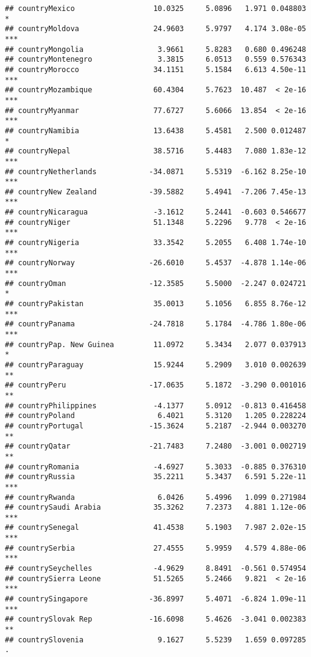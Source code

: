 \documentclass[
  11pt,
]{article}
\begin{document}
\begin{verbatim}
## countryMexico                  10.0325     5.0896   1.971 0.048803 *  
## countryMoldova                 24.9603     5.9797   4.174 3.08e-05 ***
## countryMongolia                 3.9661     5.8283   0.680 0.496248    
## countryMontenegro               3.3815     6.0513   0.559 0.576343    
## countryMorocco                 34.1151     5.1584   6.613 4.50e-11 ***
## countryMozambique              60.4304     5.7623  10.487  < 2e-16 ***
## countryMyanmar                 77.6727     5.6066  13.854  < 2e-16 ***
## countryNamibia                 13.6438     5.4581   2.500 0.012487 *  
## countryNepal                   38.5716     5.4483   7.080 1.83e-12 ***
## countryNetherlands            -34.0871     5.5319  -6.162 8.25e-10 ***
## countryNew Zealand            -39.5882     5.4941  -7.206 7.45e-13 ***
## countryNicaragua               -3.1612     5.2441  -0.603 0.546677    
## countryNiger                   51.1348     5.2296   9.778  < 2e-16 ***
## countryNigeria                 33.3542     5.2055   6.408 1.74e-10 ***
## countryNorway                 -26.6010     5.4537  -4.878 1.14e-06 ***
## countryOman                   -12.3585     5.5000  -2.247 0.024721 *  
## countryPakistan                35.0013     5.1056   6.855 8.76e-12 ***
## countryPanama                 -24.7818     5.1784  -4.786 1.80e-06 ***
## countryPap. New Guinea         11.0972     5.3434   2.077 0.037913 *  
## countryParaguay                15.9244     5.2909   3.010 0.002639 ** 
## countryPeru                   -17.0635     5.1872  -3.290 0.001016 ** 
## countryPhilippines             -4.1377     5.0912  -0.813 0.416458    
## countryPoland                   6.4021     5.3120   1.205 0.228224    
## countryPortugal               -15.3624     5.2187  -2.944 0.003270 ** 
## countryQatar                  -21.7483     7.2480  -3.001 0.002719 ** 
## countryRomania                 -4.6927     5.3033  -0.885 0.376310    
## countryRussia                  35.2211     5.3437   6.591 5.22e-11 ***
## countryRwanda                   6.0426     5.4996   1.099 0.271984    
## countrySaudi Arabia            35.3262     7.2373   4.881 1.12e-06 ***
## countrySenegal                 41.4538     5.1903   7.987 2.02e-15 ***
## countrySerbia                  27.4555     5.9959   4.579 4.88e-06 ***
## countrySeychelles              -4.9629     8.8491  -0.561 0.574954    
## countrySierra Leone            51.5265     5.2466   9.821  < 2e-16 ***
## countrySingapore              -36.8997     5.4071  -6.824 1.09e-11 ***
## countrySlovak Rep             -16.6098     5.4626  -3.041 0.002383 ** 
## countrySlovenia                 9.1627     5.5239   1.659 0.097285 .  

\end{verbatim}
\end{document}

